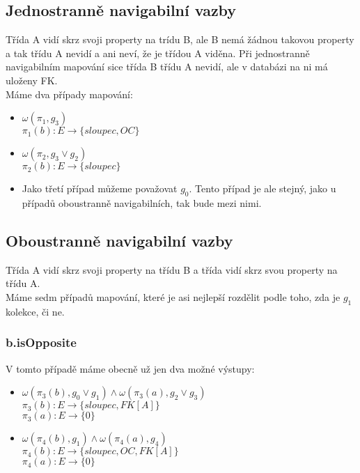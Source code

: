 \documentclass[11pt,a4paper]{article}
\begin{document}
   	\subsection{Jednostranně navigabilní vazby}
   		Třída A vidí skrz svoji property na trídu B, ale B nemá žádnou takovou property a 
   		tak třídu A nevidí a ani neví, že je třídou A viděna. Při jednostranně navigabilním
   		mapování sice třída B třídu A nevidí, ale v databázi na ni má uloženy FK.
   		\\
   		Máme dva případy mapování:
   		\begin{itemize}				    
         	\item 			$ \omega(\pi_1,g_3)$\\
         					$\pi_1(b) : E \to \{ sloupec, OC\}$
         					
         	\item         	$\omega(\pi_2, g_3 \vee g_2)$ \\
         					$\pi_2(b) : E \to \{ sloupec\}$
         	\item Jako třetí případ můžeme považovat $g_0$. Tento případ je ale stejný, 
         	jako u případů oboustranně navigabilních, tak bude mezi nimi.	  							
   		\end{itemize}
   	\subsection{Oboustranně navigabilní vazby}
   		Třída A vidí skrz svoji property na třídu B a třída vidí skrz svou property na třídu A. \\
   		Máme sedm případů mapování, které je asi nejlepší rozdělit podle toho, zda je $g_1$ kolekce, či ne.
   		\subsubsection{b.isOpposite}
   		V tomto případě máme obecně už jen dva možné výstupy:
   		   		\begin{itemize}				    
         			\item 
         							$\omega(\pi_3(b), g_0 \vee g_1) \wedge \omega(\pi_3(a), g_2 \vee g_3)$\\
         							$\pi_3(b) : E \to \{ sloupec, FK[A]\}$ \\
         							$\pi_3(a) : E \to \{ 0\}$
         			\item 			$\omega(\pi_4(b), g_1) \wedge \omega(\pi_4(a), g_4)$\\
         							$\pi_4(b) : E \to \{ sloupec, OC, FK[A]\}$ \\
         							$\pi_4(a) : E \to \{ 0\}$  		  							
   				\end{itemize}
\end{document}
